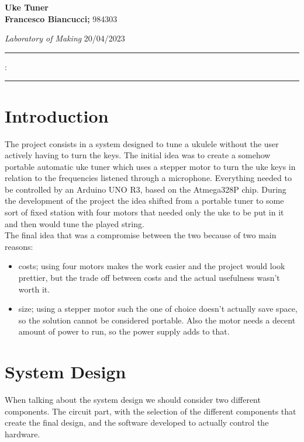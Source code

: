 \documentclass[a4paper,12pt]{article}
\renewenvironment{abstract}
 {\par\noindent\textbf{\abstractname} \ignorespaces:}
 {\par\noindent\medskip}
\begin{document}
\begin{center}
\Large{\textbf{Uke Tuner}}
\vspace{0.4cm}
\normalsize
\\ \textbf{Francesco Biancucci;} 984303 \\
\vspace{0.1cm}

\small{\textit{Laboratory of Making} 20/04/2023}
\medskip
\normalsize
\end{center}
{\color{gray}\hrule}
\vspace{0.4cm}
\begin{abstract}

\end{abstract}
{\color{gray}\hrule}
\medskip
\begin{multicols}{2}
\tableofcontents
\section{Introduction}
The project consists in a system designed to tune a ukulele without the user actively having to turn the keys. The initial idea was to create a somehow portable automatic uke tuner which uses a stepper motor to turn the uke keys in relation to the frequencies listened through a microphone. Everything needed to be controlled by an Arduino UNO R3, based on the Atmega328P chip. During the development of the project the idea shifted from a portable tuner to some sort of fixed station with four motors that needed only the uke to be put in it and then would tune the played string.\\
The final idea that was a compromise between the two because of two main reasons:
\begin{itemize}
    \item costs; using four motors makes the work easier and the project would look prettier, but the trade off between costs and the actual usefulness wasn't worth it.
    \item size; using a stepper motor such the one of choice doesn't actually save space, so the solution cannot be considered portable. Also the motor needs a decent amount of power to run, so the power supply adds to that.
\end{itemize}
\section{System Design}
When talking about the system design we should consider two different components. The circuit part, with the selection of the different components that create the final design, and the software developed to actually control the hardware.

\end{multicols}
\end{document}
